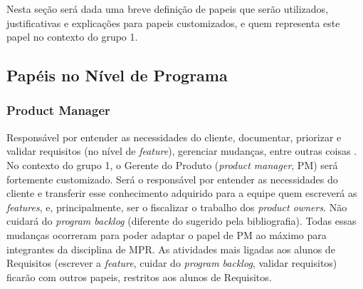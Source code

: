 Nesta seção será dada uma breve definição de papeis que serão utilizados, justificativas e explicações para papeis customizados, e quem representa este papel no contexto do grupo 1.



\subsection{Papéis no Nível de Programa}

\subsubsection{Product Manager}
Responsável por entender as necessidades do cliente, documentar, priorizar e validar requisitos (no nível de \emph{feature}), gerenciar mudanças, entre outras coisas \cite[p. 283-287]{safe001}. No contexto do grupo 1, o Gerente do Produto (\emph{product manager}, PM) será fortemente customizado. Será o responsável por entender as necessidades do cliente e transferir esse conhecimento adquirido para a equipe quem escreverá as \emph{features}, e, principalmente, ser o fiscalizar o trabalho dos \emph{product owners}. Não cuidará do \emph{program backlog} (diferente do sugerido pela bibliografia). Todas essas mudanças ocorreram para poder adaptar o papel de PM ao máximo para integrantes da disciplina de MPR. As atividades mais ligadas aos alunos de Requisitos (escrever a \emph{feature}, cuidar do \emph{program backlog}, validar requisitos) ficarão com outros papeis, restritos aos alunos de Requisitos.

